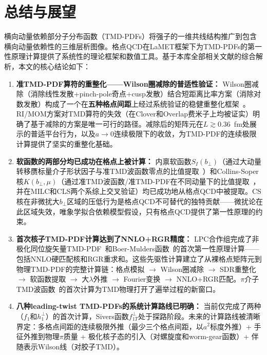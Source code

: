 \documentclass[12pt,a4paper]{ctexart}
\theoremstyle{definition}
\begin{document}
\section{总结与展望}

横向动量依赖部分子分布函数（TMD-PDFs）将强子的一维共线结构推广到包含横向动量依赖性的三维层析图像。格点QCD在LaMET框架下为TMD-PDFs的第一性原理计算提供了系统性的理论框架和数值工具。基于本库全部相关文献的综合解析，本文的核心结论如下：

\begin{enumerate}[leftmargin=*]

    \item \textbf{准TMD-PDF算符的重整化——Wilson圈减除的普适性验证：}
    Wilson圈减除（消除线性发散+pinch-pole奇点+cusp发散）结合短距离比率方案（消除对数发散）构成了一个在\textbf{五种格点间距}上经过系统验证的稳健重整化框架~\cite{Zhang2022renormTMD}。RI/MOM方案对TMD算符的失效（在Clover和Overlap费米子上均被证实）明确了基于减除的方案是唯一可行的路径。减除后的矩阵元在$L \gtrsim 0.36$~fm处展示的普适平台行为，以及$a \to 0$连续极限下的收敛，为TMD-PDF的连续极限计算提供了坚实的重整化基础。

    \item \textbf{软函数的两部分均已成功在格点上被计算：}
    内禀软函数$S_I(b_\perp)$（通过大动量转移赝标量介子形状因子与准TMD波函数零点的比值提取~\cite{LPC2020soft,Chu2023soft}）和Collins-Soper核$K(b_\perp,\mu)$（通过准TMD波函数/准TMD-PDF在不同动量下的比值提取~\cite{Chu2022CSkernel}，并在MILC和CLS两个系综上交叉验证）均已成功地从格点QCD中被提取。CS核在非微扰大$b_\perp$区域的压低行为是格点QCD不可替代的独特贡献——微扰论在此区域失效，唯象学拟合依赖模型假设，只有格点QCD提供了第一性原理的约束。

    \item \textbf{首次核子TMD-PDF计算达到了NNLO+RGR精度：}
    LPC合作组完成了非极化同位旋矢量TMD-PDF~\cite{He2024unpolTMD}和Boer-Mulders函数~\cite{Ma2025BoerMulders}的首次第一性原理计算——包括NNLO硬匹配核和RGR重求和。这些先驱性计算建立了从裸格点矩阵元到物理TMD-PDF的完整计算链：格点模拟 $\to$ Wilson圈减除 $\to$ SDR重整化 $\to$ 软函数提取 $\to$ 大$\lambda$外推 $\to$ Fourier变换 $\to$ NNLO+RGR匹配。$\pi$介子TMD波函数~\cite{Chu2023TMDWF}的首次计算为TMD物理打开了遍举过程的新窗口。

    \item \textbf{八种leading-twist TMD-PDFs的系统计算路线已明确：}
    当前仅完成了两种（$f_1$和$h_1^\perp$）的首次计算，Sivers函数$f_{1T}^\perp$处于探路阶段。未来的计算路线被清晰界定：多格点间距的连续极限外推（最少三个格点间距，以$a^2$标度外推）+ 手征外推到物理$\pi$质量 + 极化核子态的引入（对螺旋度和worm-gear函数）+ 伴随表示Wilson线（对胶子TMD）。


\end{enumerate}
\end{document}
